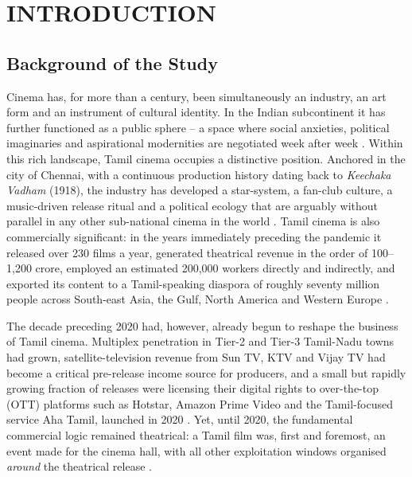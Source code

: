 \chapter{INTRODUCTION}
\label{ch:introduction}

\section{Background of the Study}
\label{sec:background}

Cinema has, for more than a century, been simultaneously an industry,
an art form and an instrument of cultural identity. In the Indian
subcontinent it has further functioned as a public sphere -- a space
where social anxieties, political imaginaries and aspirational
modernities are negotiated week after week
\citep{rajadhyaksha2009,vasudevan2010}.  Within this rich landscape,
Tamil cinema occupies a distinctive position.  Anchored in the city
of Chennai, with a continuous production history dating back to
\textit{Keechaka Vadham} (1918), the industry has developed a
star-system, a fan-club culture, a music-driven release ritual and a
political ecology that are arguably without parallel in any other
sub-national cinema in the world \citep{baskaran1996,velayutham2008}.
Tamil cinema is also commercially significant: in the years
immediately preceding the pandemic it released over 230 films a year,
generated theatrical revenue in the order of 100--1{,}200
crore, employed an estimated 200{,}000 workers directly and
indirectly, and exported its content to a Tamil-speaking diaspora of
roughly seventy million people across South-east Asia, the Gulf,
North America and Western Europe \citep{ficciey2019,kohlikhandekar2013}.

The decade preceding 2020 had, however, already begun to reshape the
business of Tamil cinema.  Multiplex penetration in Tier-2 and Tier-3
Tamil-Nadu towns had grown, satellite-television revenue from Sun TV,
KTV and Vijay TV had become a critical pre-release income source for
producers, and a small but rapidly growing fraction of releases were
licensing their digital rights to over-the-top (OTT) platforms such as
Hotstar, Amazon Prime Video and the Tamil-focused service Aha Tamil,
launched in 2020 \citep{statista2023,fica2022}.  Yet, until 2020, the
fundamental commercial logic remained theatrical:  a Tamil film was,
first and foremost, an event made for the cinema hall, with all other
exploitation windows organised \emph{around} the theatrical release
\citep{ormax2022}.

